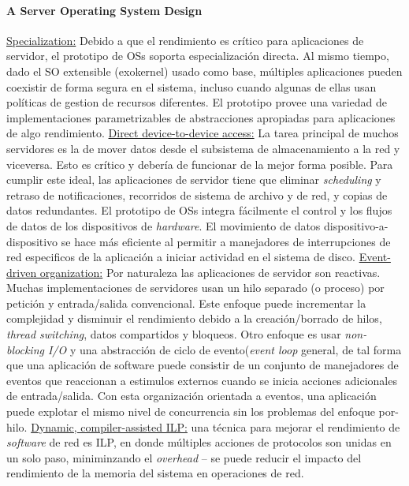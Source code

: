 \paragraph{\textnormal{\textbf{A Server Operating System Design}}}
\underline{Specialization:} Debido a que el rendimiento es crítico para aplicaciones de servidor, el prototipo de OSs soporta especialización directa. Al mismo tiempo, dado el SO extensible (exokernel) usado como base, múltiples aplicaciones pueden coexistir de forma segura en el sistema, incluso cuando algunas de ellas usan políticas de gestion de recursos diferentes. El prototipo provee una variedad de implementaciones parametrizables de abstracciones apropiadas para aplicaciones de algo rendimiento. \underline{Direct device-to-device access:} La tarea principal de muchos servidores es la de mover datos desde el subsistema de almacenamiento a la red y viceversa. Esto es crítico y debería de funcionar de la mejor forma posible. Para cumplir este ideal, las aplicaciones de servidor tiene que eliminar \textit{scheduling} y retraso de notificaciones, recorridos de sistema de archivo y de red, y copias de datos redundantes. El prototipo de OSs integra fácilmente el control y los flujos de datos de los dispositivos de \textit{hardware}. El movimiento de datos dispositivo-a-dispositivo se hace más eficiente al permitir a manejadores de interrupciones de red especificos de la aplicación a iniciar actividad en el sistema de disco. \underline{Event-driven organization:} Por naturaleza las aplicaciones de servidor son reactivas. Muchas implementaciones de servidores usan un hilo separado (o proceso) por petición y entrada/salida convencional. Este enfoque puede incrementar la complejidad y disminuir el rendimiento debido a la creación/borrado de hilos, \textit{thread switching}, datos compartidos y bloqueos. Otro enfoque es usar \textit{non-blocking I/O} y una abstracción de ciclo de evento(\textit{event loop} general, de tal forma que una aplicación de software puede consistir de un conjunto de manejadores de eventos que reaccionan a estimulos externos cuando se inicia acciones adicionales de entrada/salida. Con esta organización orientada a eventos, una aplicación puede explotar el mismo nivel de concurrencia sin los problemas del enfoque por-hilo. \underline{Dynamic, compiler-assisted ILP:} una técnica para mejorar el rendimiento de \textit{software} de red es ILP, en donde múltiples acciones de protocolos son unidas en un solo paso, miniminzando el \textit{overhead} -- se puede reducir el impacto del rendimiento de la memoria del sistema en operaciones de red.

